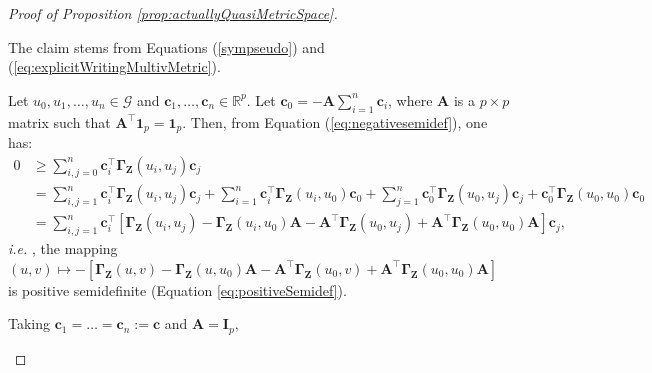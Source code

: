 \documentclass[12pt]{article}
\theoremstyle{plain}
\theoremstyle{remark}
\newcommand{\R}[0]{\mathbb{R}}
\newcommand{\onep}[0]{{\mathbf{1}_{p}}}
\newcommand{\ie}{\textit{i.e. }}
\newcommand{\dVec}[1]{{\bm{#1}}}            %
\newcommand{\latMatr}[1]{\mathbf{#1}}          %
\newcommand{\grMatr}[1]{{\boldsymbol{#1}}}   %
\newcommand{\rVec}[1]{{\bm{#1}}}            %
\newcommand{\tobi}[1]{\textcolor{teal}{#1}}
\begin{document}
\begin{proof}[Proof of Proposition \ref{prop:actuallyQuasiMetricSpace}]
\begin{enumerate}
{            \item The claim stems from Equations (\ref{sympseudo}) and (\ref{eq:explicitWritingMultivMetric}). %
            \item Let $u_0,u_1,\ldots,u_n \in \mathcal{G}$ and $\dVec{c}_1,\dots, \dVec{c}_n\in\R^p$. Let $\dVec{c}_0=-\latMatr{A}\sum_{i=1}^n \dVec{c}_i$, where $\latMatr{A}$ is a $p \times p$ matrix such that $\latMatr{A}^\top \onep = \onep$. Then, from Equation (\ref{eq:negativesemidef}), one has:
            \begin{equation*}
                \begin{split}    
                    0 &\geq \sum_{i,j=0}^n \dVec{c}_i^\top \grMatr{\Gamma}_{{\rVec{Z}}}(u_i,u_j) \dVec{c}_j \\
                    &= \sum_{i,j=1}^n \dVec{c}_i^\top \grMatr{\Gamma}_{{\rVec{Z}}}(u_i,u_j) \dVec{c}_j + \sum_{i=1}^n \dVec{c}_i^\top \grMatr{\Gamma}_{{\rVec{Z}}}(u_i,u_0) \dVec{c}_0 + \sum_{j=1}^n \dVec{c}_0^\top \grMatr{\Gamma}_{{\rVec{Z}}}(u_0,u_j) \dVec{c}_j + \dVec{c}_0^\top \grMatr{\Gamma}_{{\bm{Z}}}(u_0,u_0) \dVec{c}_0\\
                    &= \sum_{i,j=1}^n \dVec{c}_i^\top \left[\grMatr{\Gamma}_{{\bm{Z}}}(u_i,u_j)-\grMatr{\Gamma}_{{\bm{Z}}}(u_i,u_0)\latMatr{A}-\latMatr{A}^\top \grMatr{\Gamma}_{{\bm{Z}}}(u_0,u_j)+\latMatr{A}^\top\grMatr{\Gamma}_{{\bm{Z}}}(u_0,u_0)\latMatr{A}\right] \dVec{c}_j,
                \end{split}
            \end{equation*}
            \ie, the mapping $(u,v) \mapsto -[\grMatr{\Gamma}_{{\bm{Z}}}(u,v)-\grMatr{\Gamma}_{{\bm{Z}}}(u,u_0)\latMatr{A}-\latMatr{A}^\top\grMatr{\Gamma}_{{\bm{Z}}}(u_0,v)+\latMatr{A}^\top\grMatr{\Gamma}_{{\bm{Z}}}(u_0,u_0)\latMatr{A}]$ is positive semidefinite (Equation \ref{eq:positiveSemidef}). %
            \item Taking $\dVec{c}_1 = \ldots = \dVec{c}_n := \dVec{c}$ and $\latMatr{A} {=\latMatr{I}_p}$, %
}
\end{enumerate}
\end{proof}
\end{document}
